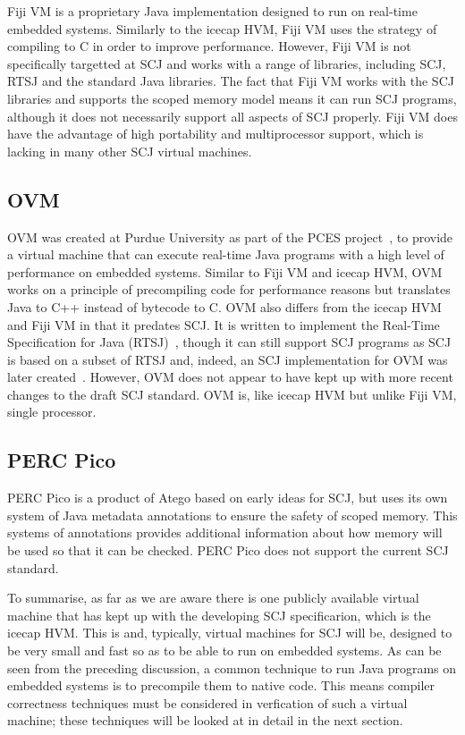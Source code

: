 \documentclass[a4paper,10pt]{report}
\begin{document}
Fiji VM is a proprietary Java implementation designed to run on real-time
embedded systems.  Similarly to the icecap HVM, Fiji VM uses the strategy of
compiling to C in order to improve performance.  However, Fiji VM is not
specifically targetted at SCJ and works with a range of libraries, including
SCJ, RTSJ and the standard Java libraries.  The fact that Fiji VM works with the
SCJ libraries and supports the scoped memory model means it can run SCJ
programs, although it does not necessarily support all aspects of SCJ properly.
Fiji VM does have the advantage of high portability and multiprocessor support,
which is lacking in many other SCJ virtual machines.

\subsection{OVM}

OVM was created at Purdue University as part of the PCES
project~\cite{baker2006}, to provide a virtual machine that can execute
real-time Java programs with a high level of performance on embedded systems.
Similar to Fiji VM and icecap HVM, OVM works on a principle of precompiling code
for performance reasons but translates Java to C++ instead of bytecode to C.
OVM also differs from the icecap HVM and Fiji VM in that it predates SCJ. It is
written to implement the Real-Time Specification for Java
(RTSJ)~\cite{gosling2000}, though it can still support SCJ programs as SCJ is
based on a subset of RTSJ and, indeed, an SCJ implementation for OVM was later
created~\cite{plsek2010}. However, OVM does not appear to have kept up with more
recent changes to the draft SCJ standard. OVM is, like icecap HVM but unlike
Fiji VM, single processor. 

\subsection{PERC Pico}

PERC Pico is a product of Atego based on early ideas for SCJ, but uses its own
system of Java metadata annotations to ensure the safety of scoped memory.  This
systems of annotations provides additional information about how memory will be
used so that it can be checked. PERC Pico does not support the current SCJ
standard.

To summarise, as far as we are aware there is one publicly available virtual
machine that has kept up with the developing SCJ specificarion, which is the
icecap HVM. This is and, typically, virtual machines for SCJ will be, designed
to be very small and fast so as to be able to run on embedded systems.  As can
be seen from the preceding discussion, a common technique to run Java programs
on embedded systems is to precompile them to native code. This means compiler
correctness techniques must be considered in verfication of such a virtual
machine; these techniques will be looked at in detail in the next section.
\end{document}
